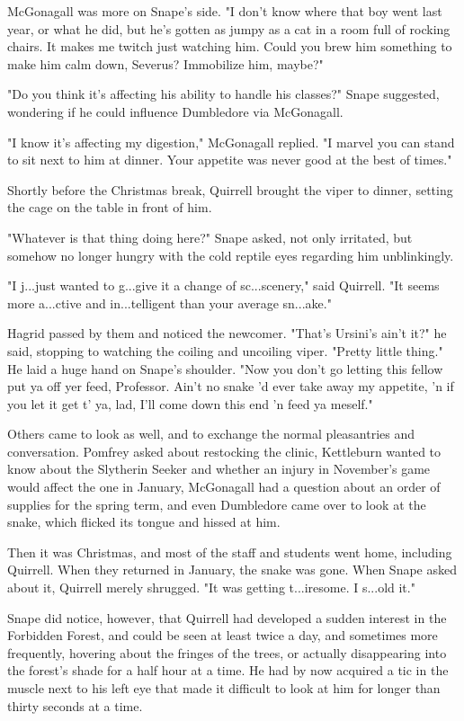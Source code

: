 \documentclass[a4paper,11pt]{article}
\begin{document}
McGonagall was more on Snape's side. "I don't know where that boy went last year, or what he did, but he's gotten as jumpy as a cat in a room full of rocking chairs. It makes me twitch just watching him. Could you brew him something to make him calm down, Severus? Immobilize him, maybe?"

"Do you think it's affecting his ability to handle his classes?" Snape suggested, wondering if he could influence Dumbledore via McGonagall.

"I know it's affecting my digestion," McGonagall replied. "I marvel you can stand to sit next to him at dinner. Your appetite was never good at the best of times."

Shortly before the Christmas break, Quirrell brought the viper to dinner, setting the cage on the table in front of him.

"Whatever is that thing doing here?" Snape asked, not only irritated, but somehow no longer hungry with the cold reptile eyes regarding him unblinkingly.

"I j...just wanted to g...give it a change of sc...scenery," said Quirrell. "It seems more a...ctive and in...telligent than your average sn...ake."

Hagrid passed by them and noticed the newcomer. "That's Ursini's ain't it?" he said, stopping to watching the coiling and uncoiling viper. "Pretty little thing." He laid a huge hand on Snape's shoulder. "Now you don't go letting this fellow put ya off yer feed, Professor. Ain't no snake 'd ever take away my appetite, 'n if you let it get t' ya, lad, I'll come down this end 'n feed ya meself."

Others came to look as well, and to exchange the normal pleasantries and conversation. Pomfrey asked about restocking the clinic, Kettleburn wanted to know about the Slytherin Seeker and whether an injury in November's game would affect the one in January, McGonagall had a question about an order of supplies for the spring term, and even Dumbledore came over to look at the snake, which flicked its tongue and hissed at him.

Then it was Christmas, and most of the staff and students went home, including Quirrell. When they returned in January, the snake was gone. When Snape asked about it, Quirrell merely shrugged. "It was getting t...iresome. I s...old it."

Snape did notice, however, that Quirrell had developed a sudden interest in the Forbidden Forest, and could be seen at least twice a day, and sometimes more frequently, hovering about the fringes of the trees, or actually disappearing into the forest's shade for a half hour at a time. He had by now acquired a tic in the muscle next to his left eye that made it difficult to look at him for longer than thirty seconds at a time.
\end{document}
